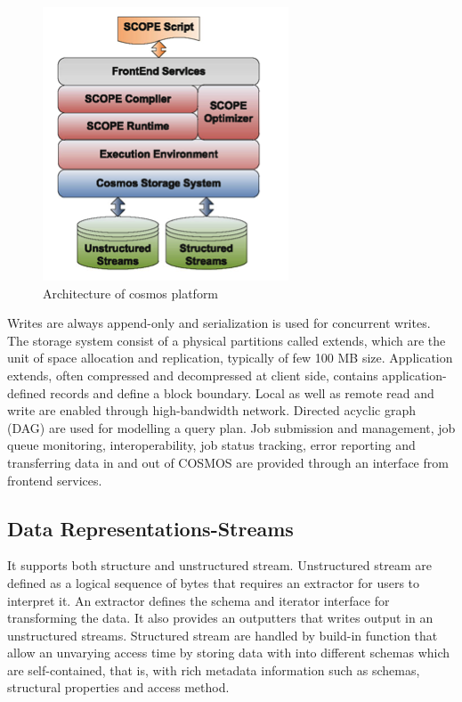 \documentclass[runningheads,a4paper]{llncs}
\begin{document}
{\begin{figure}[!htb]
	\includegraphics[scale=1]{./images/krunal1}
	\centering
	\caption{Architecture of cosmos platform }
	\label{fig:architecture_of_cosmos}
\end{figure}
Writes are always append-only and serialization is used for concurrent writes. The storage system consist of a physical partitions called extends, which are the unit of space allocation and replication, typically of few 100 MB size. Application extends, often compressed and decompressed at client side, contains application-defined records and define a block boundary. Local as well as remote read and write are enabled through high-bandwidth network. Directed acyclic graph (DAG) are used for modelling a query plan. Job submission and management, job queue monitoring, interoperability, job status tracking, error reporting and transferring data in and out of COSMOS are provided through an interface from frontend services.\\


\subsection*{Data Representations-Streams}
It supports both structure and unstructured stream. Unstructured stream are defined as a logical sequence of bytes that requires an extractor for users to interpret it. An extractor defines the schema and iterator interface for transforming the data. It also provides an outputters that writes output in an unstructured streams. Structured stream are handled by build-in function that allow an unvarying access time by storing data with into different schemas which are self-contained, that is, with rich metadata information such as schemas, structural properties and access method.\\

}
\end{document}
